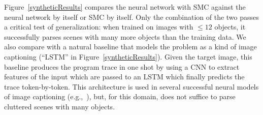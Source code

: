 \documentclass{article}
\begin{document}
Figure~\ref{syntheticResults}
compares the neural network with SMC against the neural network by
itself or SMC by itself.  Only the combination of the two passes a
critical test of generalization: when trained on images with $\leq 12$
objects, it successfully parses scenes with many more objects than the
training data.
We also compare with a natural baseline that models the problem as a kind of image captioning (``LSTM'' in Figure~\ref{syntheticResults}).
Given the target image, this baseline produces the program trace in one shot by
using a CNN to extract features of the input which are passed to an LSTM which finally predicts
the trace token-by-token.
This architecture is used in several successful neural models of image captioning (e.g.,~\cite{vinyals2015show}),
but, for this domain, does not suffice to parse cluttered scenes with many objects.
\end{document}
